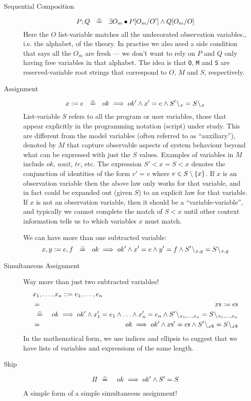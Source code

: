 \begin{description}
%
\item[Sequential Composition]
$$
  P ; Q ~\mathrel{~\widehat{=\!\!\!\!=}}~~ \exists O_m \bullet P[O_m/O'] \land Q[O_m/O]
$$
Here the $O$ list-variable matches all the undecorated
observation variables., i.e. the alphabet, of the theory.
In practise we also need a side condition that says all the $O_m$
are fresh --- we don't want to rely on $P$ and $Q$ only having free variables
in that alphabet.
The idea is that \texttt{O}, \texttt{M} and \texttt{S} are reserved-variable root strings that
correspond to $O$, $M$ and $S$, respectively.
%
\item[Assignment]
$$
  x := e ~\defs~ ok \implies ok' \land x' = e
    \land S'\less x = S\less x
$$
List-variable $S$ refers to all the program or user variables,
those that appear explicitly in the programming notation (script) under study.
This are different from the model variables (often referred to as
``auxiliary''), denoted by $M$ that capture observable aspects
of system behaviour beyond what can be expressed with just the $S$
values. Examples of variables in $M$ include $ok$, $wait$, $tr$, etc.
The expression $S'\less x = S\less x$
denotes the conjunction of identities of the form $v'=v$
where $v \in S\setminus\{{x}\}$.
If $x$ is an observation variable
then the above law only works for that variable,
and in fact could be expanded out (given $S$)
to an explicit law for that variable.
If $x$ is not an observation variable,
then it should be a ``variable-variable'',
and typically we cannot complete the match of $S\less x$
until
other context information tells us to which variables $x$ must match.
\par
We can have more than one subtracted variable:
$$
  x,y := e,f ~\defs~ ok \implies ok' \land x' = e \land y'=f
    \land S'\less{x,y} = S\less{x,y}
$$
\item[Simultaneous Assignment]
Way more than just two subtracted variables!
\begin{eqnarray*}
  \lefteqn{x_1,\ldots,x_n ::= e_1, \ldots , e_n}
\\ &=& \lst x := \lst e
\\ &\defs&
     ok \implies ok'
     \land x'_1 = e_1 \land \ldots \land x'_n = e_n
     \land S'\less{x_1,\ldots,x_n} = S\less{x_1,\ldots,x_n}
\\ &=& ok \implies ok'
    \land \lst x' = \lst e
    \land S'\less{\lst x} = S\less{\lst x}
\end{eqnarray*}
In the mathematical form, we use indices and ellipsis
to suggest that we have lists of variables and expressions
of the same length.
\item[Skip]
\begin{eqnarray*}
  \mathit{I\!I} &\mathrel{~\widehat{=\!\!\!\!=}}~& ok \implies ok' \land S'=S
\end{eqnarray*}
A simple form of a simple simultaneous assignment!
\end{description}

